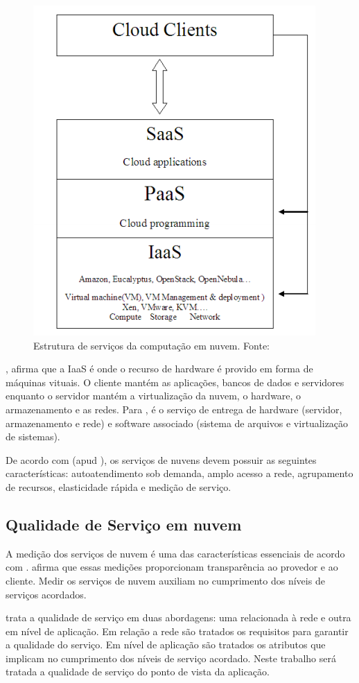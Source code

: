\documentclass[conference]{IEEEtran}
\begin{document}
\begin{figure}[ht]
\centering
\includegraphics[width=.3\textwidth]{figuras/cloud_structure.png}
\caption{Estrutura de serviços da computação em nuvem. Fonte: \cite{sefraoui2012openstack}}
\label{fig:cloud_structure}
\end{figure}

, afirma que a IaaS é onde o recurso de hardware é provido em forma de máquinas vituais. O cliente mantém
as aplicações, bancos de dados e servidores enquanto o servidor mantém a virtualização da nuvem, o hardware, o armazenamento e as redes.
Para , é o serviço de entrega de hardware (servidor, armazenamento e rede) e software associado 
(sistema de arquivos e virtualização de sistemas).

De acordo com  (apud \cite{mell2011nist}), os serviços de nuvens devem possuir as seguintes
características: autoatendimento sob demanda, amplo acesso a rede,
agrupamento de recursos, elasticidade rápida e medição de serviço.

\subsection{Qualidade de Serviço em nuvem}

A medição dos serviços de nuvem é uma das características essenciais de acordo com 
.  afirma que essas medições proporcionam
transparência ao provedor e ao cliente. Medir os serviços de nuvem auxiliam no 
cumprimento dos níveis de serviços acordados.


 trata a qualidade de serviço em duas abordagens:
uma relacionada à rede e outra em nível de aplicação. Em relação a rede são tratados
os requisitos para garantir a qualidade do serviço. Em nível de aplicação são tratados
os atributos que implicam no cumprimento dos níveis de serviço acordado. 
Neste trabalho será tratada a qualidade de serviço do ponto de vista da aplicação.
\end{document}
